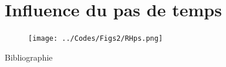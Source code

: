 \documentclass[10pt]{beamer}
\begin{document}
\section*{Influence du pas de temps}

\begin{frame}{\secname}

    \begin{figure}[hbtp]
        \centering
        \texttt{[image: ../Codes/Figs2/RHps.png]}
    \end{figure}
    
\end{frame}

\begin{frame}[allowframebreaks]{Bibliographie}
    \printbibliography
\end{frame}
\end{document}
